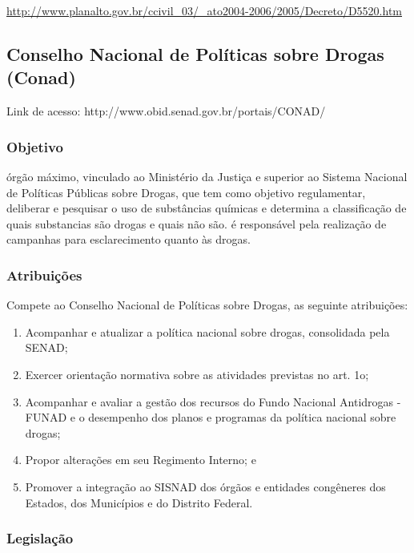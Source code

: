 \url{http://www.planalto.gov.br/ccivil_03/_ato2004-2006/2005/Decreto/D5520.htm}
\newpage
\subsection*{Conselho Nacional de Políticas sobre Drogas (Conad)}

Link de acesso: http://www.obid.senad.gov.br/portais/CONAD/


\subsubsection*{Objetivo}



órgão máximo, vinculado ao Ministério da Justiça e superior
ao Sistema Nacional de Políticas Públicas sobre Drogas, que tem
como objetivo regulamentar, deliberar e pesquisar o uso de
substâncias químicas e determina a classificação de quais
substancias são drogas e quais não são. é responsável pela
realização de campanhas para esclarecimento quanto às drogas.


\subsubsection*{Atribuições}


Compete ao Conselho Nacional de Políticas sobre Drogas, as seguinte
atribuições:

\begin{enumerate}
\item 
Acompanhar e atualizar a política nacional sobre drogas, consolidada
pela SENAD;
\item 
Exercer orientação normativa sobre as atividades previstas no art.
1o;
\item 
Acompanhar e avaliar a gestão dos recursos do Fundo Nacional
Antidrogas - FUNAD e o desempenho dos planos e programas da política
nacional sobre drogas;
\item 
Propor alterações em seu Regimento Interno; e
\item 
Promover a integração ao SISNAD dos órgãos e entidades
congêneres dos Estados, dos Municípios e do Distrito Federal.
\end{enumerate}


\subsubsection*{Legislação}

